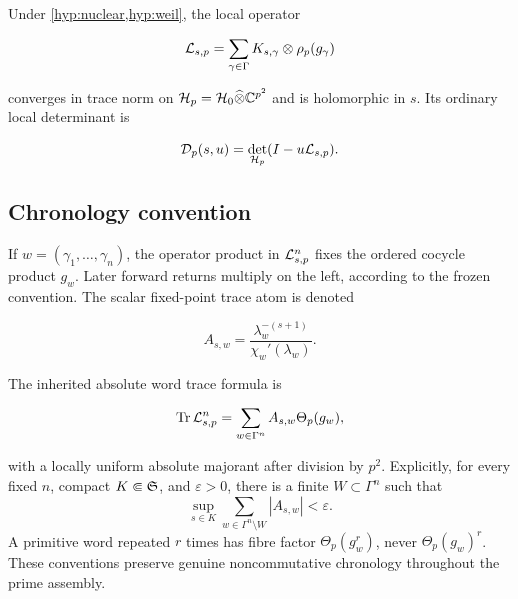 Under \cref{hyp:nuclear,hyp:weil}, the local operator

\begin{equation}
 \mathcal L_{s,p}
 =\sum_{\gamma\in\Gamma}K_{s,\gamma}\otimes\rho_p(g_\gamma)
 \label{eq:local-operator}
\end{equation}

converges in trace norm on
\(\mathcal H_p=\mathcal H_0\widehat\otimes\mathbb C^{p^2}\) and is holomorphic in \(s\).  Its ordinary local
determinant is

\begin{equation}
 \mathcal D_p(s,u)=\det_{\mathcal H_p}(I-u\mathcal L_{s,p}).
 \label{eq:local-det}
\end{equation}

\subsection{Chronology convention}

If \(w=(\gamma_1,\ldots,\gamma_n)\), the operator product in
\(\mathcal L_{s,p}^n\) fixes the ordered cocycle product \(g_w\).  Later forward
returns multiply on the left, according to the frozen convention.  The
scalar fixed-point trace atom is denoted

\begin{equation}
 A_{s,w}=\frac{\lambda_w^{-(s+1)}}{\chi_w'(\lambda_w)}.
 \label{eq:word-atom}
\end{equation}

The inherited absolute word trace formula is

\begin{equation}
 \operatorname{Tr}\mathcal L_{s,p}^n
 =\sum_{w\in\Gamma^n}A_{s,w}\Theta_p(g_w),
 \label{eq:local-word-trace}
\end{equation}

with a locally uniform absolute majorant after division by \(p^2\).
Explicitly, for every fixed \(n\), compact \(K\Subset\mathfrak S\), and
\(\varepsilon>0\), there is a finite \(W\subset\Gamma^n\) such that
\begin{equation}
 \sup_{s\in K}\sum_{w\in\Gamma^n\setminus W}|A_{s,w}|<\varepsilon.
 \label{eq:word-uniform-tail}
\end{equation}
A
primitive word repeated \(r\) times has fibre factor
\(\Theta_p(g_w^r)\), never \(\Theta_p(g_w)^r\).  These conventions preserve
genuine noncommutative chronology throughout the prime assembly.
